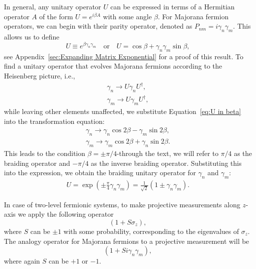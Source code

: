 \documentclass{article}
\begin{document}
In general, any unitary operator $ U $ can be expressed in terms of a Hermitian operator $ A $ of the form $ U = e^{i\beta A} $ with some angle $ \beta $. For Majorana fermion operators, we can begin with their parity operator, denoted as $ P_{nm} = i \gamma_n \gamma_m $. This allows us to define
\begin{equation}
	U \equiv e^{\beta \gamma_n \gamma_m} \quad \text{or} \quad U = \cos{\beta} + \gamma_n \gamma_m \sin{\beta},
	\label{eq:U in beta}
\end{equation}
see Appendix~\ref{sec:Expanding Matrix Exponential} for a proof of this result. To find a unitary operator that evolves Majorana fermions according to the Heisenberg picture, i.e.,
$$
	\begin{aligned}
		\gamma_n \rightarrow U \gamma_n U ^\dagger, \\
		\gamma_m \rightarrow U \gamma_m U ^\dagger,
	\end{aligned}
$$
while leaving other elements unaffected, we substitute Equation~\ref{eq:U in beta} into the transformation equation:
$$
	\begin{aligned}
		\gamma_n \rightarrow \gamma_n \cos{2 \beta}  - \gamma_m \sin{2 \beta}, \\
		\gamma_m \rightarrow \gamma_m \cos{2 \beta} + \gamma_n \sin{2 \beta} .
		\label{eq:subst in transformation}
	\end{aligned}
$$
This leads to the condition $ \beta = \pm \pi / 4 $-through the text, we will refer to $ \pi /4 $ as the braiding operator and $ -\pi /4 $ as the inverse braiding operator. Substituting this into the expression, we obtain the braiding unitary operator for $ \gamma_n $ and $ \gamma_m $:
$$
	\begin{aligned}
		U = \exp \left( \pm \frac{\pi}{4} \gamma_n \gamma_m\right) = \frac{1}{\sqrt{2}}\left(1 \pm \gamma_n \gamma_m\right).
	\end{aligned}
$$

In case of two-level fermionic systems, to make projective measurements along $ z $-axis we apply the following operator
\begin{equation*}
	(1 + S \sigma_z),
\end{equation*}
where $ S $ can be $ \pm 1 $ with some probability, corresponding to the eigenvalues of $ \sigma_z $. The analogy operator for Majorana fermions to a projective measurement will be
\[
	(1 + S i \gamma_n \gamma_m),
\]
where again $ S $ can be $ +1 $ or $ -1 $.
\end{document}
